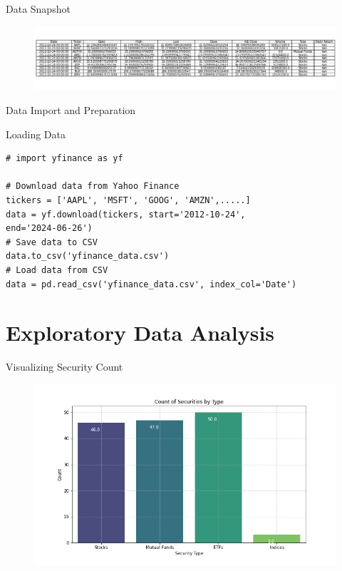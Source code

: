 \documentclass{beamer}
\begin{document}
\begin{frame}{Data Snapshot}
    \begin{figure}
        \centering
        \includegraphics[width=\textwidth]{data_snapshot.png}
    \end{figure}
\end{frame}

\begin{frame}[fragile]{Data Import and Preparation}
    \begin{block}{Loading Data}
        \begin{verbatim}
# import yfinance as yf

# Download data from Yahoo Finance
tickers = ['AAPL', 'MSFT', 'GOOG', 'AMZN',.....]
data = yf.download(tickers, start='2012-10-24', 
end='2024-06-26')
# Save data to CSV
data.to_csv('yfinance_data.csv')
# Load data from CSV
data = pd.read_csv('yfinance_data.csv', index_col='Date')
        \end{verbatim}
    \end{block}
\end{frame}

\section{Exploratory Data Analysis}
\begin{frame}[fragile]{Visualizing Security Count}
    \begin{figure}
        \centering
        \includegraphics[width=\textwidth]{histogram_security_count.png}
    \end{figure}
\end{frame}
\end{document}
